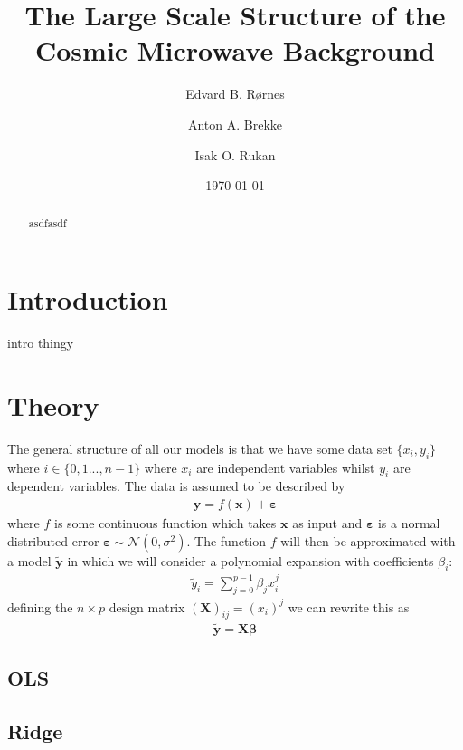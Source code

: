 \documentclass[%
reprint,
amsmath,amssymb,
aps,
]{revtex4-2}
\begin{document}
	
\title{The Large Scale Structure of the Cosmic Microwave Background}

\author{Edvard B. Rørnes}
\author{Anton A. Brekke}
\author{Isak O. Rukan}

\date{\today}
\begin{abstract}
	asdfasdf
\end{abstract}
\maketitle
\tableofcontents
\section{Introduction}
intro thingy

\section{Theory}
The general structure of all our models is that we have some data set $\{x_i,y_i\}$ where $i\in\{0,1...,n-1\}$ where $x_i$ are independent variables whilst $y_i$ are dependent variables. The data is assumed to be described by
\begin{align}
	\bm y=f(\bm x)+\bm \varepsilon
\end{align}
where $f$ is some continuous function which takes $\bm x$ as input and $\bm\varepsilon$ is a normal distributed error $\bm\varepsilon\sim\mathcal{N}(0,\sigma^2)$. The function $f$ will then be approximated with a model $\tilde{\bm y}$ in which we will consider a polynomial expansion with coefficients $\beta_i$:
\begin{align}
	\tilde{y}_i=\sum_{j=0}^{p-1}\beta_j x_i^j
\end{align}
defining the $n\times p$ design matrix $(\bm X)_{ij}=(x_i)^j$ we can rewrite this as
\begin{align}
	\tilde{\bm y}=\bm X\bm\beta
\end{align}


\subsection{OLS}

\subsection{Ridge}
\end{document}
